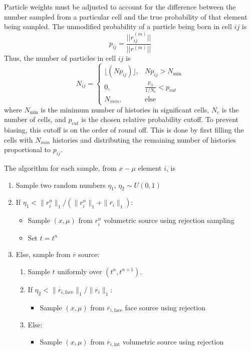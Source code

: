 Particle weights must be adjusted to account for
the difference between the number sampled from a particular cell and the true probability
of that element being sampled.  The unmodified probability of a particle being born in cell $ij$ is 
\begin{equation}
    p_{ij} = \frac{||r^{(m)}_{ij}||}{||r^{(m)}||}
\end{equation}
Thus, the number of
particles in cell $ij$ is 
\begin{equation}
    N_{ij} = 
\left\{\begin{matrix}
    \lfloor(Np_{ij})\rfloor, & Np_{ij} > N_{\min}
    \\ 0, & \frac{p_{ij}}{1/N_c} < p_{cut}
\\ N_{min}, & \text{else}
\end{matrix}\right.
\end{equation}
where $N_{\min}$ is the minimum number of histories in significant cells, $N_c$  is the number of cells, and $p_{cut}$ is the chosen relative probability cutoff.
To prevent biasing, this cutoff is on the order of round off.
This is done by first filling the cells with $N_{min}$ histories and distributing the
remaining number of histories proportional to $p_{ij}$.

The algorithm for each sample, from $x-\mu$ element $i$, is 
\begin{enumerate}
    \item Sample two random numbers $\eta_1$, $\eta_2\sim U(0,1)$ 
    \item If $\eta_1 < \|r_i^{n}\|_1/(\|r_i^{n}\|_1 + \|\overline{r_i}\|_1)$:
    \begin{itemize}
        \item Sample $(x,\mu)$ from $r_i^{n}$ volumetric source using rejection sampling
        \item Set $t=t^n$
    \end{itemize}
\item Else, sample from $\overline r$ source:
    \begin{enumerate}
        \item \label{itm:time_step}Sample $t$ uniformly over $(t^{n},t^{n+1})$.
        \item If $\eta_2 < \|\overline{r}_{i,\text{face}}\|_1/\|\overline{r}_{i}\|_1$:
            \begin{itemize}
                \item Sample $(x,\mu)$ from $\overline r_{i,\text{face}}$ face source using rejection
            \end{itemize}
        \item Else:
            \begin{itemize}
                \item Sample $(x,\mu)$ from $\overline r_{i,\text{int}}$ volumetric source using rejection
            \end{itemize}
    \end{enumerate}
\end{enumerate}



